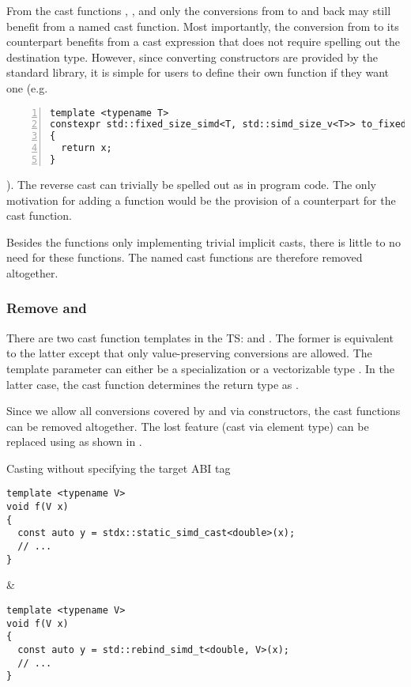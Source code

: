 From the cast functions \stdx{}, \stdx{}, and
\stdx{} only the conversions from \simdabi{} to \simdabi{} and back may still benefit from a named cast
function.
Most importantly, the conversion from  to its 
counterpart benefits from a cast expression that does not require spelling out
the destination type.
However, since converting constructors are provided by the standard library, it
is simple for users to define their own  function if they
want one (e.g.
\begin{lstlisting}[numbers=left,float={hbtp},label=lst:userdefined-to-fixed-size,caption={
  Example of a user-defined \code{to_fixed_size} implementation if explicit casts are provided
}]
template <typename T>
constexpr std::fixed_size_simd<T, std::simd_size_v<T>> to_fixed_size(std::simd<T> x)
{
  return x;
}
\end{lstlisting}
).
The reverse cast can trivially be spelled out as 
in program code.
The only motivation for adding a  function would be the
provision of a counterpart for the  cast function.

Besides the functions only implementing trivial implicit casts, there is little
to no need for these functions.
The named cast functions are therefore removed altogether.

\subsubsection{Remove  and }
There are two cast function templates in the TS:  and
.
The former is equivalent to the latter except that only value-preserving
conversions are allowed.
The template parameter can either be a  specialization or a
vectorizable type .
In the latter case, the cast function determines the return type as
.

Since we allow all conversions covered by \stdx{} and
\stdx{} via \std{} constructors, the cast
functions can be removed altogether.
The lost feature (cast via element type) can be replaced using
 as shown in .
\begin{tonytable}{Casting without specifying the target ABI tag}\label{tt:tsvsp1928casts}
  \begin{lstlisting}
template <typename V>
void f(V x)
{
  const auto y = stdx::static_simd_cast<double>(x);
  // ...
}
  \end{lstlisting}
  &
  \begin{lstlisting}
template <typename V>
void f(V x)
{
  const auto y = std::rebind_simd_t<double, V>(x);
  // ...
}
  \end{lstlisting}
\end{tonytable}%

